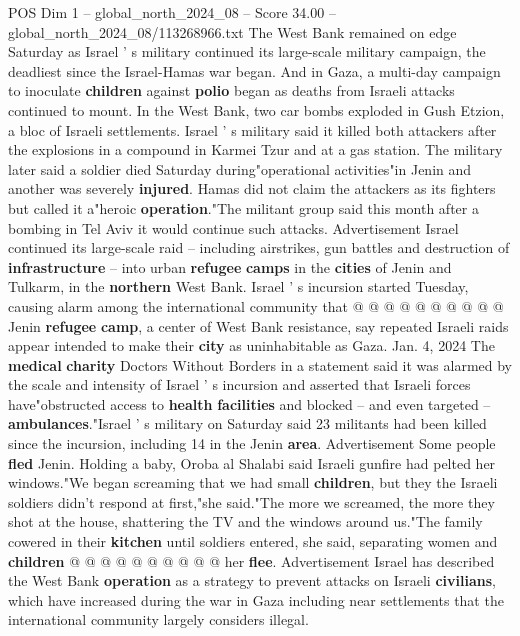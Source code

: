 \begin{textsample}{POS Dim 1 – global\_north\_2024\_08 – Score 34.00 – global\_north\_2024\_08/113268966.txt}  \label{ex:f1_pos_401}
The West Bank remained on edge Saturday as Israel ' s military continued its large-scale military campaign, the deadliest since the Israel-Hamas war began.
And in Gaza, a multi-day campaign to inoculate \textbf{children} against \textbf{polio} began as deaths from Israeli attacks continued to mount.
In the West Bank, two car bombs exploded in Gush Etzion, a bloc of Israeli settlements.
Israel ' s military said it killed both attackers after the explosions in a compound in Karmei Tzur and at a gas station.
The military later said a soldier died Saturday during"operational activities"in Jenin and another was severely \textbf{injured}.
Hamas did not claim the attackers as its fighters but called it a"heroic \textbf{operation}."The militant group said this month after a bombing in Tel Aviv it would continue such attacks.
Advertisement Israel continued its large-scale raid -- including airstrikes, gun battles and destruction of \textbf{infrastructure} -- into urban \textbf{refugee} \textbf{camps} in the \textbf{cities} of Jenin and Tulkarm, in the \textbf{northern} West Bank.
Israel ' s incursion started Tuesday, causing alarm among the international community that @ @ @ @ @ @ @ @ @ @ Jenin \textbf{refugee} \textbf{camp}, a center of West Bank resistance, say repeated Israeli raids appear intended to make their \textbf{city} as uninhabitable as Gaza.
Jan. 4, 2024 The \textbf{medical} \textbf{charity} Doctors Without Borders in a statement said it was alarmed by the scale and intensity of Israel ' s incursion and asserted that Israeli forces have"obstructed access to \textbf{health} \textbf{facilities} and blocked -- and even targeted -- \textbf{ambulances}."Israel ' s military on Saturday said 23 militants had been killed since the incursion, including 14 in the Jenin \textbf{area}.
Advertisement Some people \textbf{fled} Jenin.
Holding a baby, Oroba al Shalabi said Israeli gunfire had pelted her windows."We began screaming that we had small \textbf{children}, but they the Israeli soldiers didn't respond at first,"she said."The more we screamed, the more they shot at the house, shattering the TV and the windows around us."The family cowered in their \textbf{kitchen} until soldiers entered, she said, separating women and \textbf{children} @ @ @ @ @ @ @ @ @ @ her \textbf{flee}.
Advertisement Israel has described the West Bank \textbf{operation} as a strategy to prevent attacks on Israeli \textbf{civilians}, which have increased during the war in Gaza including near settlements that the international community largely considers illegal.

\end{textsample}
